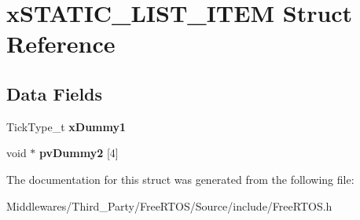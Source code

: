 \hypertarget{structx_s_t_a_t_i_c___l_i_s_t___i_t_e_m}{}\section{x\+S\+T\+A\+T\+I\+C\+\_\+\+L\+I\+S\+T\+\_\+\+I\+T\+EM Struct Reference}
\label{structx_s_t_a_t_i_c___l_i_s_t___i_t_e_m}
\subsection*{Data Fields}
\begin{DoxyCompactItemize}
\item 
\mbox{\label{structx_s_t_a_t_i_c___l_i_s_t___i_t_e_m_a7eacc6e12219b6aee0a8838ae4d5fa67}} 
Tick\+Type\+\_\+t {\bfseries x\+Dummy1}
\item 
\mbox{\label{structx_s_t_a_t_i_c___l_i_s_t___i_t_e_m_adf39af1efe87f452d7c2213ca93110a5}} 
void $\ast$ {\bfseries pv\+Dummy2} \mbox{[}4\mbox{]}
\end{DoxyCompactItemize}


The documentation for this struct was generated from the following file\+:\begin{DoxyCompactItemize}
\item 
Middlewares/\+Third\+\_\+\+Party/\+Free\+R\+T\+O\+S/\+Source/include/Free\+R\+T\+O\+S.\+h\end{DoxyCompactItemize}
